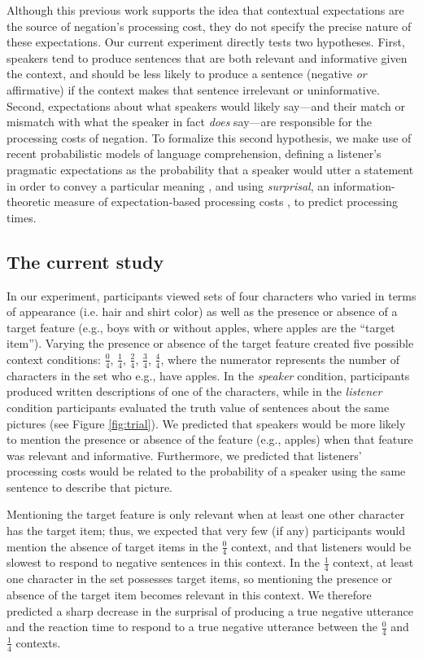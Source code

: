 \documentclass[man, noapacite]{apa2}
\begin{document}
Although this previous work supports the idea that contextual expectations are the source of negation's processing cost, they do not specify the precise nature of these expectations. Our current experiment directly tests two hypotheses.  First, speakers tend to produce sentences that are both relevant and informative given the context, and should be less likely to produce a sentence (negative \emph{or} affirmative) if the context makes that sentence irrelevant or uninformative. Second, expectations about what speakers would likely say---and their match or mismatch with what the speaker in fact \emph{does} say---are responsible for the processing costs of negation. To formalize this second hypothesis, we make use of recent probabilistic models of language comprehension, defining a listener's pragmatic expectations as the probability that a speaker would utter a statement in order to convey a particular meaning \cite{frank2012}, and using \emph{surprisal}, an information-theoretic measure of expectation-based processing costs \cite{levy2008}, to predict processing times.  

\subsection{The current study}
In our experiment, participants viewed sets of four characters who varied in terms of appearance (i.e. hair and shirt color) as well as the presence or absence of a target feature (e.g., boys with or without apples, where apples are the ``target item''). Varying the presence or absence of the target feature created five possible context conditions: $\frac{0}{4}$, $\frac{1}{4}$, $\frac{2}{4}$, $\frac{3}{4}$, $\frac{4}{4}$, where the numerator represents the number of characters in the set who e.g., have apples. In the \emph{speaker} condition, participants produced written descriptions of one of the characters, while in the \emph{listener} condition participants evaluated the truth value of sentences about the same pictures (see Figure \ref{fig:trial}). We predicted that speakers would be more likely to mention the presence or absence of the feature (e.g., apples) when that feature was relevant and informative. Furthermore, we predicted that listeners' processing costs would be related to the probability of a speaker using the same sentence to describe that picture. 

Mentioning the target feature is only relevant when at least one other character has the target item; thus, we expected that very few (if any) participants would mention the absence of target items in the $\frac{0}{4}$ context, and that listeners would be slowest to respond to negative sentences in this context. In the $\frac{1}{4}$ context, at least one character in the set possesses target items, so mentioning the presence or absence of the target item becomes relevant in this context. We therefore predicted a sharp decrease in the surprisal of producing a true negative utterance and the reaction time to respond to a true negative utterance between the $\frac{0}{4}$ and $\frac{1}{4}$ contexts.
\end{document}
